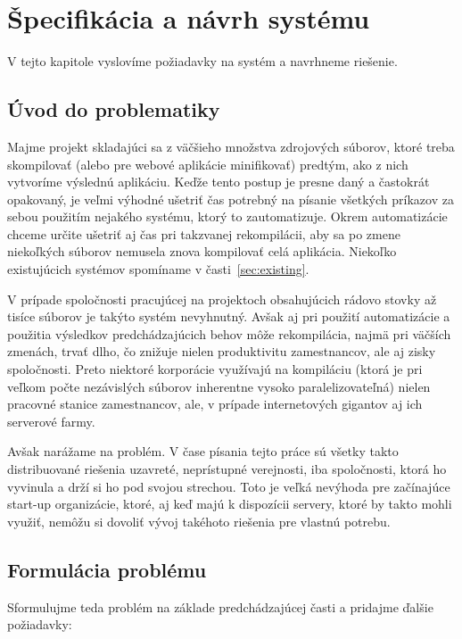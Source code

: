 \chapter{\v{S}pecifik\'{a}cia a n\'{a}vrh syst\'{e}mu}
\label{ch:spec}

V tejto kapitole vyslovíme požiadavky na systém a navrhneme riešenie.

\section{\'{U}vod do problematiky}
\label{sec:intro}

Majme projekt skladajúci sa z väčšieho množstva zdrojových súborov, ktoré treba
skompilovať (alebo pre webové aplikácie minifikovať) predtým, ako z nich vytvoríme
výslednú aplikáciu. Keďže tento postup je presne daný a častokrát opakovaný,
je veľmi výhodné ušetriť čas potrebný na písanie všetkých príkazov za sebou
použitím nejakého systému, ktorý to zautomatizuje. Okrem automatizácie chceme
určite ušetriť aj čas pri takzvanej rekompilácii, aby sa po zmene niekoľkých súborov
nemusela znova kompilovať celá aplikácia. Niekoľko existujúcich systémov spomíname
v časti~\ref{sec:existing}.

V prípade spoločnosti pracujúcej na projektoch obsahujúcich rádovo stovky až tisíce
súborov je takýto systém nevyhnutný. Avšak aj pri použití automatizácie a použitia
výsledkov predchádzajúcich behov môže rekompilácia, najmä pri väčších zmenách,
trvať dlho, čo znižuje nielen produktivitu zamestnancov, ale aj zisky spoločnosti.
Preto niektoré korporácie využívajú na kompiláciu (ktorá je pri veľkom počte
nezávislých súborov inherentne vysoko paralelizovateľná) nielen pracovné stanice
zamestnancov, ale, v prípade internetových gigantov aj ich serverové farmy.

Avšak narážame na problém. V čase písania tejto práce sú všetky takto distribuované
riešenia uzavreté, neprístupné verejnosti, iba spoločnosti, ktorá ho vyvinula
a drží si ho pod svojou strechou. Toto je veľká nevýhoda pre začínajúce start-up
organizácie, ktoré, aj keď majú k dispozícii servery, ktoré by takto mohli využiť,
nemôžu si dovoliť vývoj takéhoto riešenia pre vlastnú potrebu.

\section{Formul\'{a}cia probl\'{e}mu}
\label{sec:problem}

Sformulujme teda problém na základe predchádzajúcej časti a pridajme ďalšie
požiadavky:

